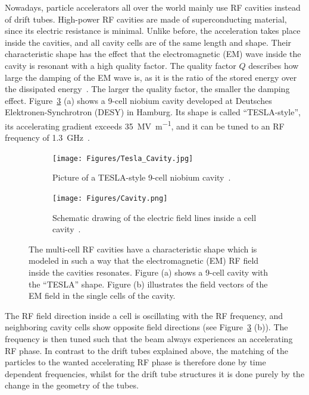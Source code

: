 Nowadays, particle accelerators all over the world mainly use RF cavities instead of drift tubes.
High-power RF cavities are made of superconducting material, since its electric resistance is minimal.
Unlike before, the acceleration takes place inside the cavities, and all cavity cells are of the same length and shape.
Their characteristic shape has the effect that the electromagnetic (EM) wave inside the cavity is resonant with a high quality factor.
The quality factor $Q$ describes how large the damping of the EM wave is, as it is the ratio of the stored energy over the dissipated energy~\cite[p. 148]{Wilson}.
The larger the quality factor, the smaller the damping effect.
Figure~\ref{fig:Cavities} (a) shows a 9-cell niobium cavity developed at Deutsches Elektronen-Synchrotron (DESY) in Hamburg.
Its shape is called ``TESLA-style'', its accelerating gradient exceeds \SI{35}{\mega\volt\per\meter}, and it can be tuned to an RF frequency of \SI{1.3}{\giga\hertz}~\cite[p. 15f]{TDR31}.
\begin{figure}
\begin{subfigure}[b]{0.49\textwidth}
\centering
 \texttt{[image: Figures/Tesla\_Cavity.jpg]}
\caption[Tesla-style 9-cell cavity]{Picture of a TESLA-style 9-cell niobium cavity~\cite[p. 15]{TDR31}.}
\label{fig:Tesla_Cavity}
\end{subfigure}\hfill
\begin{subfigure}[b]{0.49\textwidth}
\centering
 \texttt{[image: Figures/Cavity.png]}
\caption[Electric field in a cell cavity]{Schematic drawing of the electric field lines inside a cell cavity~\cite[p. 47]{Desy_SummerStudent_Lecture}.}
\label{fig:Cavity}
\end{subfigure}
\caption[Picture and schematic of multi-cell RF cavities]{The multi-cell RF cavities have a characteristic shape which is modeled in such a way that the electromagnetic (EM) RF field inside the cavities resonates. Figure (a) shows a 9-cell cavity with the ``TESLA'' shape. Figure (b) illustrates the field vectors of the EM field in the single cells of the cavity.}
\label{fig:Cavities}
\end{figure}
The RF field direction inside a cell is oscillating with the RF frequency, and neighboring cavity cells show opposite field directions (see Figure~\ref{fig:Cavities} (b)).
The frequency is then tuned such that the beam always experiences an accelerating RF phase.
In contrast to the drift tubes explained above, the matching of the particles to the wanted accelerating RF phase is therefore done by time dependent frequencies, whilst for the drift tube structures it is done purely by the change in the geometry of the tubes.


